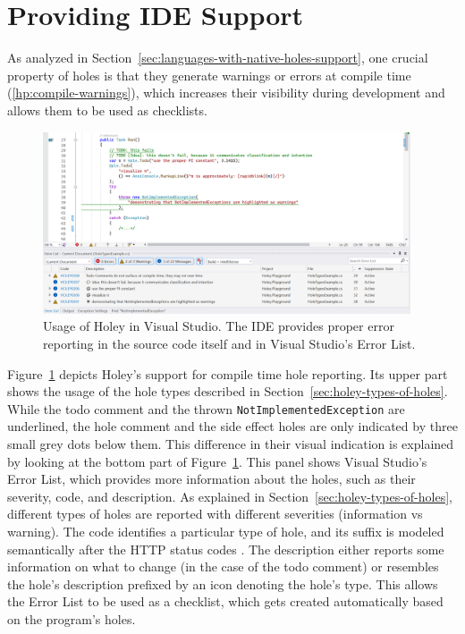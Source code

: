\section{Providing IDE Support}
\label{sec:providing-ide-support}
As analyzed in Section~\ref{sec:languages-with-native-holes-support}, one crucial property of holes is that they generate warnings or errors at compile time (\ref{hp:compile-warnings}), which increases their visibility during development and allows them to be used as checklists.
%
\begin{figure}[ht]
    \centering
    \includegraphics[width=0.97\textwidth]{images/ide-reporting}
    \caption{Usage of Holey in Visual Studio. The IDE provides proper error reporting in the source code itself and in Visual Studio's Error List.}
    \label{fig:providing-ide-support}
\end{figure}
%
Figure~\ref{fig:providing-ide-support} depicts Holey's support for compile time hole reporting.
Its upper part shows the usage of the hole types described in Section~\ref{sec:holey-types-of-holes}.
While the todo comment and the thrown \verb|NotImplementedException| are underlined, the hole comment and the side effect holes are only indicated by three small grey dots below them.
This difference in their visual indication is explained by looking at the bottom part of Figure~\ref{fig:providing-ide-support}.
This panel shows Visual Studio's Error List, which provides more information about the holes, such as their severity, code, and description.
As explained in Section~\ref{sec:holey-types-of-holes}, different types of holes are reported with different severities (information vs warning).
The code identifies a particular type of hole, and its suffix is modeled semantically after the HTTP status codes \cite{mozilla_http_2023}.
The description either reports some information on what to change (in the case of the todo comment) or resembles the hole's description prefixed by an icon denoting the hole's type.
This allows the Error List to be used as a checklist, which gets created automatically based on the program's holes.


